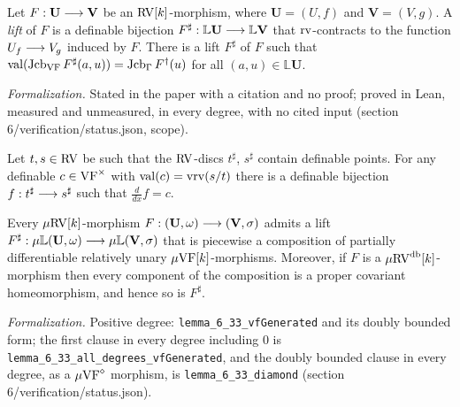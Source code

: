 \setcounter{theorem}{30}
\begin{lemma}
\label{iso-lifted-vol}
\leanok
{}
Let $F:\mathbf{U}\longrightarrow\mathbf{V}$ be an $\mathrm{RV}[k]$-morphism, where $\mathbf{U}=(U,f)$ and $\mathbf{V}=(V,g)$. A \emph{lift} of $F$ is a definable bijection $F^\sharp:\mathbb{L}\mathbf{U}\longrightarrow\mathbb{L}\mathbf{V}$ that $\operatorname{rv}$-contracts to the function $U_f\longrightarrow V_g$ induced by $F$. There is a lift $F^\sharp$ of $F$ such that $\operatorname{val}(\operatorname{Jcb}_{\mathrm{VF}}F^\sharp(a,u))=\operatorname{Jcb}_\Gamma F^{\dagger}(u)$ for all $(a,u)\in\mathbb{L}\mathbf{U}$.

\emph{Formalization.} Stated in the paper with a citation and no proof; proved in Lean, measured and unmeasured, in every degree, with no cited input (section 6/verification/status.json, scope).
\end{lemma}

\setcounter{theorem}{31}
\begin{remark}
\label{rvdisc-stre}
\leanok
{}
Let $t,s\in\mathrm{RV}$ be such that the $\mathrm{RV}$-discs $t^\sharp$, $s^\sharp$ contain definable points. For any definable $c\in\mathrm{VF}^\times$ with $\operatorname{val}(c)=\operatorname{vrv}(s/t)$ there is a definable bijection $f:t^\sharp\longrightarrow s^\sharp$ such that $\frac{d}{dx}f=c$.
\end{remark}

\setcounter{theorem}{32}
\begin{lemma}
\label{L-measure-class-lift}
\leanok
{}
Every $\mu\mathrm{RV}[k]$-morphism $F:(\mathbf{U},\omega)\longrightarrow(\mathbf{V},\sigma)$ admits a lift $F^\sharp:\mu\mathbb{L}(\mathbf{U},\omega)\longrightarrow\mu\mathbb{L}(\mathbf{V},\sigma)$ that is piecewise a composition of partially differentiable relatively unary $\mu\mathrm{VF}[k]$-morphisms. Moreover, if $F$ is a $\mu\mathrm{RV}^{\operatorname{db}}[k]$-morphism then every component of the composition is a proper covariant homeomorphism, and hence so is $F^\sharp$.

\emph{Formalization.} Positive degree: \texttt{lemma\_6\_33\_vfGenerated} and its doubly bounded form; the first clause in every degree including $0$ is \texttt{lemma\_6\_33\_all\_degrees\_vfGenerated}, and the doubly bounded clause in every degree, as a $\mu\mathrm{VF}^{\diamond}$ morphism, is \texttt{lemma\_6\_33\_diamond} (section 6/verification/status.json).
\end{lemma}

